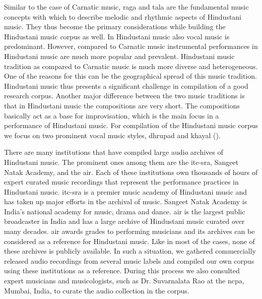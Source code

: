 Similar to the case of Carnatic music, \gls{raga} and \gls{tala} are the fundamental music concepts with which to describe melodic and rhythmic aspects of Hindustani music. They thus become the primary considerations while building the Hindustani music corpus as well. In Hindustani music also vocal music is predominant. However, compared to Carnatic music instrumental performances in Hindustani music are much more popular and prevalent. Hindustani music tradition as compared to Carnatic music is much more diverse and heterogeneous. One of the reasons for this can be the geographical spread of this music tradition. Hindustani music thus presents a significant challenge in compilation of a good research corpus. Another major difference between the two music traditions is that in Hindustani music the compositions are very short. The compositions basically act as a base for improvisation, which is the main focus in a performance of Hindustani music. For compilation of the Hindustani music corpus we focus on two prominent vocal music styles, \gls{dhrupad} and \gls{khayal} (). %

There are many institutions that have compiled large audio archives of Hindustani music. The prominent ones among them are the \gls{itc-sra}, Sangeet Natak Academy, and the \gls{air}. Each of these institutions own thousands of hours of expert curated music recordings that represent the performance practices in Hindustani music. \gls{itc-sra} is a premier music academy of Hindustani music and has taken up major efforts in the archival of music. Sangeet Natak Academy is India’s national academy for music, drama and dance. \gls{air} is the largest public broadcaster in India and has a large archive of Hindustani music curated over many decades. \gls{air} awards grades to performing musicians and its archives can be considered as a reference for Hindustani music. Like in most of the cases, none of these archives is publicly available. In such a situation, we gathered commercially released audio recordings from several music labels and compiled our own corpus using these institutions as a reference. During this process we also consulted expert musicians and musicologists, such as Dr. Suvarnalata Rao at the \gls{ncpa}, Mumbai, India, to curate the audio collection in the corpus. 

